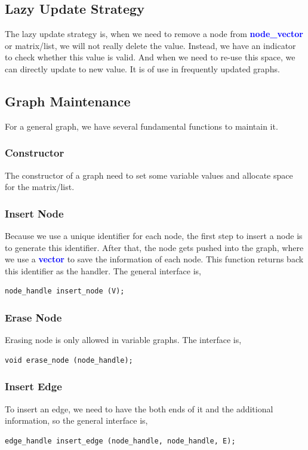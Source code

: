 \documentclass[]{article}
\begin{document}
\subsection {Lazy Update Strategy}
The lazy update strategy is, when we need to remove a node from \textbf{\textcolor{blue}{node\_vector}} or matrix/list, we will not really delete the value. Instead, we have an indicator to check whether this value is valid. And when we need to re-use this space, we can directly update to new value. It is of use in frequently updated graphs.

\subsection{Graph Maintenance} 
For a general graph, we have several fundamental functions to maintain it.

\subsubsection {Constructor}
The constructor of a graph need to set some variable values and allocate space for the matrix/list.
\subsubsection {Insert Node}
Because we use a unique identifier for each node, the first step to insert a node is to generate this identifier. After that, the node gets pushed into the graph, where we use a \textbf{\textcolor{blue}{vector}} to save the information of each node. This function returns back this identifier as the handler. The general interface is,
\begin{lstlisting}
node_handle insert_node (V);
\end{lstlisting}
\subsubsection{Erase Node}
Erasing node is only allowed in variable graphs. The interface is,
\begin{lstlisting}
void erase_node (node_handle);
\end{lstlisting}
\subsubsection {Insert Edge}
To insert an edge, we need to have the both ends of it and the additional information, so the general interface is,
\begin{lstlisting}
edge_handle insert_edge (node_handle, node_handle, E);
\end{lstlisting}
\end{document}
